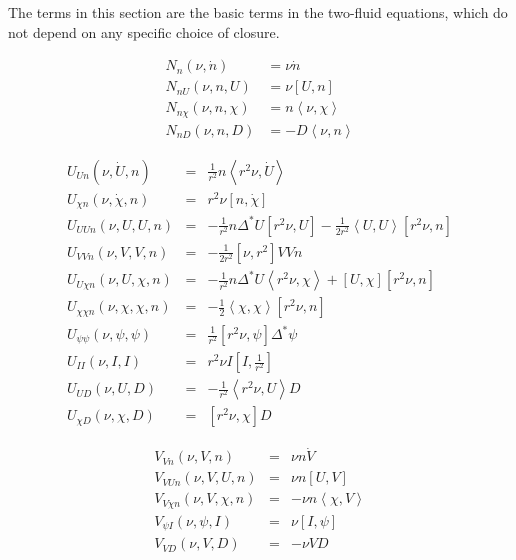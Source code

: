 \documentclass[letterpaper]{book}
\newcommand{\gs}[1]{\Delta^* #1}
\newcommand{\pb}[2]{\left[#1,#2\right]}
\newcommand{\ip}[2]{\left\langle  #1,#2\right\rangle}
\begin{document}
The terms in this section are the basic terms in the two-fluid
equations, which do not depend on any specific choice of closure.

\begin{equation}
  \begin{array}{ll}
  N_n(\nu, \dot{n}) & = \nu \dot{n}\\
  N_{n U}(\nu, n, U) & = \nu \pb{U}{n}\\
  N_{n \chi}(\nu, n, \chi) & = n \ip{\nu}{\chi}\\
  N_{n D}(\nu, n, D) & = - D \ip{\nu}{n}
  \end{array}
\end{equation}

\begin{equation}
  \begin{array}{lcl}
    U_{U n}(\nu, \dot U, n) & = & \frac{1}{r^2} n \ip{r^2 \nu}{\dot{U}}
    \\
    U_{\chi n}(\nu, \dot \chi, n) & = & r^2 \nu \pb{n}{\dot{\chi}}
    \\
    U_{U U n}(\nu, U, U, n) & = & -\frac{1}{r^2} n \gs{U} \pb{r^2\nu}{U}
      - \frac{1}{2 r^2} \ip{U}{U}\pb{r^2\nu}{n}
    \\
    U_{V V n}(\nu, V,  V, n) & = &  -\frac{1}{2 r^2} \pb{\nu}{r^2} V V n
    \\
    U_{U \chi n}(\nu, U, \chi, n) & = & 
      - \frac{1}{r^2}n \gs{U}\ip{r^2\nu}{\chi} 
      + \pb{U}{\chi} \pb{r^2\nu}{n}
    \\
    U_{\chi \chi n}(\nu, \chi, \chi, n) & = &
      - \frac{1}{2} \ip{\chi}{\chi} \pb{r^2 \nu}{n}
    \\
    U_{\psi \psi}(\nu, \psi, \psi) & = &
      \frac{1}{r^2} \pb{r^2 \nu}{\psi} \gs{\psi}
    \\
    U_{I I}(\nu, I, I) & = &r^2 \nu I \pb{I}{\frac{1}{r^2}}
    \\
    U_{U D}(\nu, U, D) & = & -\frac{1}{r^2} \ip{r^2 \nu}{U} D
    \\
    U_{\chi D}(\nu, \chi, D) & = & \pb{r^2 \nu}{\chi} D
  \end{array}
\end{equation}

\begin{equation}
  \begin{array}{lcl}
    V_{V n}(\nu, V, n) & = & \nu n \dot{V}\\
    V_{V U n}(\nu, V, U, n) & = & \nu n \pb{U}{V}\\
    V_{V \chi n}(\nu, V, \chi, n) & = & -\nu n \ip{\chi}{V}\\
    V_{\psi I}(\nu, \psi, I) & = & \nu \pb{I}{\psi}\\
    V_{V D}(\nu, V, D) & = & -\nu V D
  \end{array}
\end{equation}    
\end{document}
